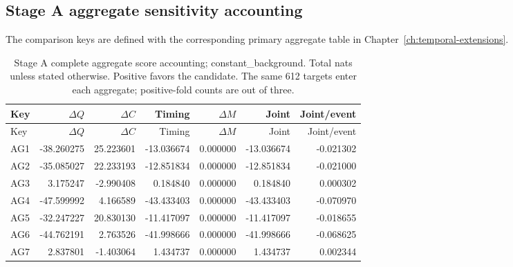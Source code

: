 \subsection{Stage A aggregate sensitivity accounting}
\label{app:audit09-stage-a-sensitivity}
The comparison keys are defined with the corresponding primary aggregate table in Chapter~\ref{ch:temporal-extensions}.

{\small
\setlength{\tabcolsep}{3pt}
\begin{longtable}{lrrrrrr}
\caption{Stage A complete aggregate score accounting; constant\_background. Total nats unless stated otherwise. Positive favors the candidate. The same 612 targets enter each aggregate; positive-fold counts are out of three.}\label{tab:AG-constant_background}\\
\toprule
Key & $\Delta Q$ & $\Delta C$ & Timing & $\Delta M$ & Joint & Joint/event\\\midrule
\endfirsthead
\toprule
Key & $\Delta Q$ & $\Delta C$ & Timing & $\Delta M$ & Joint & Joint/event\\\midrule
\endhead
AG1 & -38.260275 & 25.223601 & -13.036674 & 0.000000 & -13.036674 & -0.021302\\
AG2 & -35.085027 & 22.233193 & -12.851834 & 0.000000 & -12.851834 & -0.021000\\
AG3 & 3.175247 & -2.990408 & 0.184840 & 0.000000 & 0.184840 & 0.000302\\
AG4 & -47.599992 & 4.166589 & -43.433403 & 0.000000 & -43.433403 & -0.070970\\
AG5 & -32.247227 & 20.830130 & -11.417097 & 0.000000 & -11.417097 & -0.018655\\
AG6 & -44.762191 & 2.763526 & -41.998666 & 0.000000 & -41.998666 & -0.068625\\
AG7 & 2.837801 & -1.403064 & 1.434737 & 0.000000 & 1.434737 & 0.002344\\
\bottomrule
\end{longtable}
}


